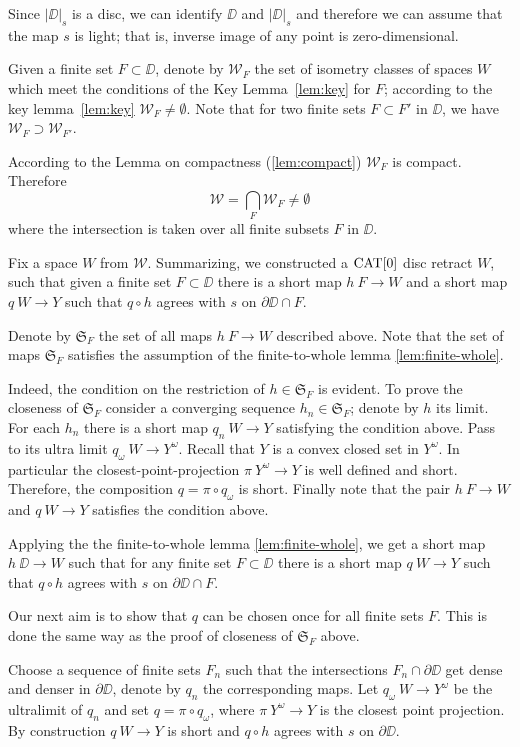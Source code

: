 \documentclass{article}
\begin{document}
Since $|\DD|_s$ is a disc, we can identify $\DD$ and $|\DD|_s$
and therefore we can assume that the map $s$ is light;
that is, inverse image of any point is zero-dimensional.

Given a finite set $F\subset \DD$,
denote by $\mathcal{W}_F$
the set of isometry classes of spaces $W$ which meet the conditions of the Key Lemma~\ref{lem:key}
for $F$;
according to the key lemma~\ref{lem:key} $\mathcal{W}_F\ne\emptyset$.
Note that for two finite sets $F\subset F'$ in $\DD$,
we have $\mathcal{W}_F\supset \mathcal{W}_{F'}$.

According to the Lemma on compactness (\ref{lem:compact}) $\mathcal{W}_F$ is compact.
Therefore 
\[\mathcal{W}
=
\bigcap_{F}\mathcal{W}_F\ne \emptyset\]
where the intersection is taken over all finite subsets $F$ in $\DD$. 


Fix a space $W$ from $\mathcal{W}$.
Summarizing, we constructed a $\mathop{\rm CAT}\nolimits[0]$ disc retract $W$,
such that given a finite set $F\subset \DD$ there is a short map $h\:F\to W$ 
and a short map $q\:W\to Y$ such that $q\circ h$ agrees with $s$ on $\partial\DD\cap F$.

Denote by $\mathfrak{S}_F$ the set of all maps $h\:F\to W$ described above.
Note that the set of maps $\mathfrak{S}_F$ satisfies the assumption of the finite-to-whole lemma \ref{lem:finite-whole}.

Indeed, the condition on the restriction of $h\in  \mathfrak{S}_F$ is evident.
To prove the closeness of $\mathfrak{S}_F$ consider a converging sequence $h_n\in  \mathfrak{S}_F$;
denote by $h$ its limit.
For each $h_n$ there is a short map $q_n\:W\to Y$ satisfying the condition above.
Pass to its ultra limit $q_\omega\:W\to Y^\omega$.
Recall that $Y$ is a convex closed set in $Y^\omega$.
In particular the closest-point-projection $\pi\:Y^\omega\to Y$ is well defined and short.
Therefore, the composition $q=\pi\circ q_\omega$ is short.
Finally note that the pair $h\:F\to W$ and $q\:W\to Y$ satisfies the condition above.

Applying the the finite-to-whole lemma \ref{lem:finite-whole},
we get a short map $h\:\DD\to W$ such that for any finite set $F\subset \DD$ there is a short map $q\:W\to Y$ such that $q\circ h$ agrees with $s$ on $\partial \DD\cap F$.

Our next aim is to show that $q$ can be chosen once for all finite sets $F$.
This is done the same way as the proof of closeness of $\mathfrak{S}_F$ above.

Choose a sequence of finite sets $F_n$ such that the intersections $F_n\cap\partial \DD$ get dense and denser in $\partial \DD$, denote by $q_n$ the corresponding maps.
Let $q_\omega\:W\to Y^\omega$ be the ultralimit of $q_n$ and set $q=\pi\circ q_\omega$,
where $\pi\:Y^\omega\to Y$ is the closest point projection.
By construction $q\:W\to Y$ is short and $q\circ h$ agrees with $s$ on $\partial \DD$.
\end{document}
